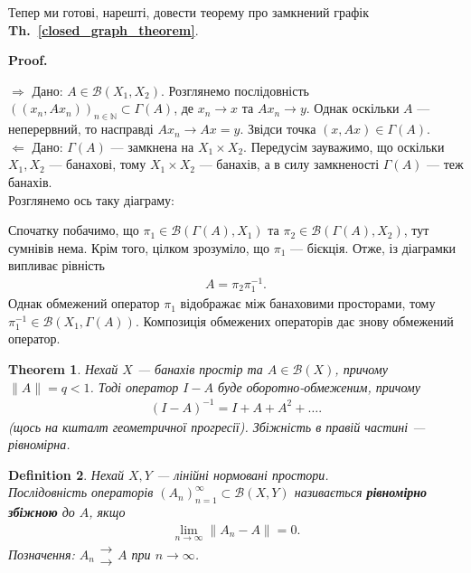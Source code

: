 \documentclass[a4paper, 10pt]{article}
\makeatletter
\def\rightproof{$\boxed{\Rightarrow}$ }
\def\leftproof{$\boxed{\Leftarrow}$ }
\theoremstyle{theoremdd}
\newtheorem{theorem}{Theorem}[subsection]
\theoremstyle{theoremdd}
\newtheorem{definition}[theorem]{Definition}
\theoremstyle{theoremdd}
\theoremstyle{theoremdd}
\theoremstyle{theoremdd}
\theoremstyle{theoremdd}
\theoremstyle{theoremdd}
\theoremstyle{theoremdd}
\newcommand\thref[1]{\textbf{Th.~\ref{#1}}}
\renewenvironment{proof}[1][Proof.\\]{\par
\pushQED{\hfill \qed}%
\normalfont \topsep6\p@\@plus6\p@\relax
\trivlist
\item\relax
{\bfseries
#1\@addpunct{.}}\hspace\labelsep\ignorespaces
}{%
\popQED\endtrivlist\@endpefalse
}
\makeatother
\begin{document}
Тепер ми готові, нарешті, довести теорему про замкнений графік \thref{closed_graph_theorem}.

\begin{proof}
\rightproof Дано: $A \in \mathcal{B}(X_1,X_2)$. Розглянемо послідовність $( (x_n, Ax_n) )_{n \in \mathbb{N}} \subset \Gamma(A)$, де $x_n \to x$ та $Ax_n \to y$. Однак оскільки $A$ --- неперервний, то насправді $Ax_n \to Ax = y$. Звідси точка $(x,Ax) \in \Gamma(A)$.
\bigskip \\
\leftproof Дано: $\Gamma(A)$ --- замкнена на $X_1 \times X_2$. Передусім зауважимо, що оскільки $X_1, X_2$ --- банахові, тому $X_1 \times X_2$ --- банахів, а в силу замкненості $\Gamma(A)$ --- теж банахів.\\
Розглянемо ось таку діаграму:
\begin{figure}[H]
\centering
{}
\end{figure}
Спочатку побачимо, що $\pi_1 \in \mathcal{B}(\Gamma(A),X_1)$ та $\pi_2 \in \mathcal{B}(\Gamma(A),X_2)$, тут сумнівів нема. Крім того, цілком зрозуміло, що $\pi_1$ --- бієкція. Отже, із діаграмки випливає рівність
\begin{align*}
A = \pi_2 \pi_1^{-1}.
\end{align*}
Однак обмежений оператор $\pi_1$ відображає між банаховими просторами, тому $\pi_1^{-1} \in \mathcal{B}(X_1,\Gamma(A))$. Композиція обмежених операторів дає знову обмежений оператор.
\end{proof}

\begin{theorem}
\label{invertible_and_geometric_progression}
Нехай $X$ --- банахів простір та $A \in \mathcal{B}(X)$, причому $\|A\| = q < 1$. Тоді оператор $I-A$ буде оборотно-обмеженим, причому
\begin{align*}
(I-A)^{-1} = I + A + A^2 + \dots.
\end{align*}
(\textit{щось на кшталт геометричної прогресії}). Збіжність в правій частині --- рівномірна.
\end{theorem}

\begin{definition}
Нехай $X,Y$ --- лінійні нормовані простори.\\
Послідовність операторів $(A_n)_{n=1}^\infty \subset \mathcal{B}(X,Y)$ називається \textbf{рівномірно збіжною} до $A$, якщо
\begin{align*}
\lim_{n \to \infty}\|A_n - A\| = 0.
\end{align*}
Позначення: $A_n \substack{\to \\ \to} A$ при $n \to \infty$.
\end{definition}
\end{document}
